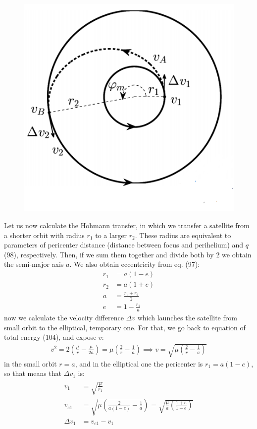 \documentclass[12pt,a4paper]{article}
\begin{document}
\begin{figure}
\includegraphics[scale=0.5]{8}
\end{figure}
Let us now calculate the Hohmann transfer, in which we transfer a satellite from a shorter orbit with radius $r_1$ to a larger $r_2$. These radius are equivalent to parameters of pericenter distance (distance between focus and perihelium) and $q$ (98), respectively. Then, if we sum them together and divide both by 2 we obtain the semi-major axis $a$. We also obtain eccentricity from eq. (97):
\begin{align}
    r_1&=a(1-e) \\
    r_2&=a(1+e ) \\
    a&=\frac{r_1+r_2}{2} \\
    e&=1-\frac{r_1}{a}
\end{align}
now we calculate the velocity difference $\Delta v$ which launches the satellite from small orbit to the elliptical, temporary one. For that, we go back to equation of total energy (104), and expose $v$:
\begin{align}
    v^2=2(\frac{\mu}{r}-\frac{\mu}{2a})=\mu(\frac{2}{r}-\frac{1}{a}) \implies v=\sqrt{\mu(\frac{2}{r}-\frac{1}{a})}
\end{align}
in the small orbit $r=a$, and in the elliptical one the pericenter is $r_1=a(1-e)$, so that means that $\Delta v_1$ is:
\begin{align}
\begin{split}
    v_{1}&=\sqrt{\frac{\mu}{r_1}} \\
    v_{e1}&=\sqrt{\mu(\frac{2}{a(1-e)}-\frac{1}{a})}=\sqrt{\frac{\mu}{a}(\frac{1+e}{1-e})} \\
    \Delta v_1&=v_{e1}-v_1
\end{split}
\end{align}
\end{document}
